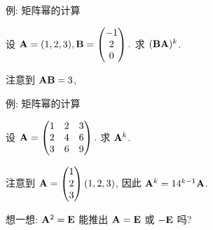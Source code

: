 \begin{frame}{例: 矩阵幂的计算}
	\onslide<+->
	\begin{example}
		设 
		${\mathbf{A}}=(1,2,3),{\mathbf{B}}=\begin{pmatrix}
			-1\\2\\0
		\end{pmatrix}.$
		求 $({\mathbf{B}}{\mathbf{A}})^k$.
	\end{example}
	\onslide<+->
	\begin{solution}
		注意到 ${\mathbf{A}}{\mathbf{B}}=3$,
		\onslide<+->{%
			因此
			\[(\bfB\bfA)^k=\bfB(\bfA\bfB)^{k-1}\bfA
				\visible<+->{=\bfB\cdot 3^{k-1}\cdot \bfA
					=3^{k-1}\bfB\bfA}
				\visible<+->{=\begin{pmatrix}
					-3^{k-1}&-2\cdot 3^{k-1}&-3^k\\
					2\cdot 3^{k-1}&4\cdot 3^{k-1}&2\cdot3^{k}\\
					0&0&0
				\end{pmatrix}.}\]
		}
	\end{solution}
\end{frame}


\begin{frame}{例: 矩阵幂的计算}
	\onslide<+->
	\begin{exercise}
		设 
		${\mathbf{A}}=\begin{pmatrix}
			1&2&3\\
			2&4&6\\
			3&6&9
		\end{pmatrix}.$
		求 ${\mathbf{A}}^k$.
	\end{exercise}
	\onslide<+->
	\begin{answer}
		注意到 ${\mathbf{A}}=\begin{pmatrix}
			1\\2\\3
		\end{pmatrix}(1,2,3)$, 因此 ${\mathbf{A}}^k=14^{k-1}{\mathbf{A}}$.
	\end{answer}
	\onslide<+->
	想一想: ${\mathbf{A}}^2={\mathbf{E}}$ 能推出 ${\mathbf{A}}={\mathbf{E}}$ 或 $-{\mathbf{E}}$ 吗?
\end{frame}



